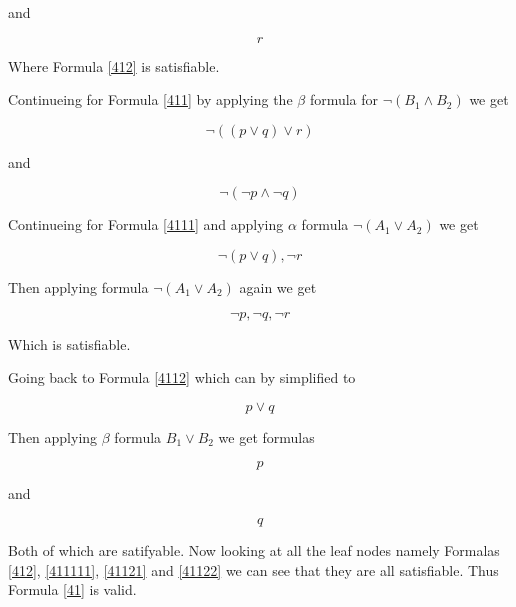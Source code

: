 \documentclass[10pt,a4paper]{article}
\begin{document}
and

\begin{equation}
\label{412}
 r
\end{equation}

Where Formula \ref{412} is satisfiable.

Continueing for Formula \ref{411} by applying the $\beta$ formula for $\neg (B_1 \wedge B_2)$ we get



 \begin{equation}
 \label{4111}
  \neg (( p \vee q ) \vee r )
 \end{equation}

 and 
 
 \begin{equation}
 \label{4112}
  \neg ( \neg p \wedge \neg q )
 \end{equation}


Continueing for Formula \ref{4111} and applying $\alpha$ formula $\neg ( A_1 \vee A_2 )$ we get

\begin{equation}
\label{41111}
 \neg (p \vee q), \neg r 
\end{equation}

Then applying formula $\neg ( A_1 \vee A_2 )$ again we get

\begin{equation}
\label{411111}
 \neg p, \neg q, \neg r
\end{equation}

Which is satisfiable.

Going back to Formula \ref{4112} which can by simplified to 

\begin{equation}
 p \vee q
\end{equation}

Then applying $\beta$ formula $B_1 \vee B_2$ we get formulas

\begin{equation}
 \label{41121}
 p
\end{equation}

and 

\begin{equation}
\label{41122}
q
\end{equation}

Both of which are satifyable. Now looking at all the leaf nodes namely 
Formalas \ref{412}, \ref{411111}, \ref{41121} and \ref{41122} we can see that they are all satisfiable. Thus
Formula \ref{41} is valid.
\end{document}
